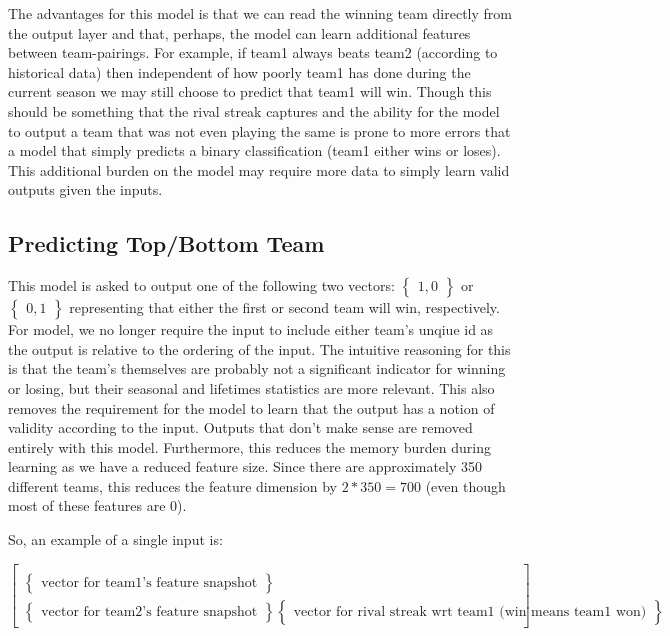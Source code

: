 \documentclass{article} %
\begin{document}
The advantages for this model is that we can read the winning team directly from the output layer and that, perhaps, the model can learn additional features between team-pairings.  For example, if team1 always beats team2 (according to historical data) then independent of how poorly team1 has done during the current season we may still choose to predict that team1 will win.  Though this should be something that the rival streak captures and the ability for the model to output a team that was not even playing the same is prone to more errors that a model that simply predicts a binary classification (team1 either wins or loses).  This additional burden on the model may require more data to simply learn valid outputs given the inputs.

\subsection{Predicting Top/Bottom Team}
\label{sec:architectures-winner-top-bottom}

This model is asked to output one of the following two vectors: $\begin{Bmatrix} 1, 0 \end{Bmatrix}$ or $\begin{Bmatrix} 0, 1 \end{Bmatrix}$ representing that either the first or second team will win, respectively.  For model, we no longer require the input to include either team's unqiue id as the output is relative to the ordering of the input.  The intuitive reasoning for this is that the team's themselves are probably not a significant indicator for winning or losing, but their seasonal and lifetimes statistics are more relevant.  This also removes the requirement for the model to learn that the output has a notion of validity according to the input.  Outputs that don't make sense are removed entirely with this model.  Furthermore, this reduces the memory burden during learning as we have a reduced feature size.  Since there are approximately 350 different teams, this reduces the feature dimension by $2 * 350 = 700$ (even though most of these features are 0).

So, an example of a single input is:

\[
\begin{bmatrix}
  \\
  \begin{Bmatrix}
    \text{vector for team1's feature snapshot}
  \end{Bmatrix}
  \\
  \begin{Bmatrix}
    \text{vector for team2's feature snapshot}
  \end{Bmatrix}
  \begin{Bmatrix}
    \text{vector for rival streak wrt team1 (win means team1 won)}
  \end{Bmatrix}
\end{bmatrix}
\]
\end{document}
